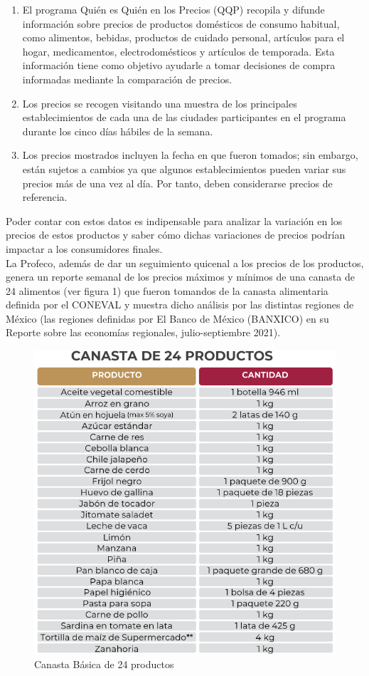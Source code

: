 \documentclass{article}
\begin{document}
\begin{enumerate}
\item El programa Quién es Quién en los Precios (QQP) recopila y difunde información sobre precios de productos domésticos de consumo habitual, como alimentos, bebidas, productos de cuidado personal, artículos para el hogar, medicamentos, electrodomésticos y artículos de temporada. Esta información tiene como objetivo ayudarle a tomar decisiones de compra informadas mediante la comparación de precios.

\item Los precios se recogen visitando una muestra de los principales establecimientos de cada una de las ciudades participantes en el programa durante los cinco días hábiles de la semana.

\item  Los precios mostrados incluyen la fecha en que fueron tomados; sin embargo, están sujetos a cambios ya que algunos establecimientos pueden variar sus precios más de una vez al día. Por tanto, deben considerarse precios de referencia.

\end{enumerate}

Poder contar con estos datos es indipensable para analizar la variación en los precios de estos productos y saber cómo dichas variaciones de precios podrían impactar a los consumidores finales.\\

La Profeco, además de dar un seguimiento quicenal a los precios de los productos, genera un reporte semanal de los precios máximos y mínimos de una canasta de 24 alimentos (ver figura 1) que fueron tomandos de la canasta alimentaria definida por el CONEVAL y muestra dicho análisis por las distintas regiones de México (las regiones definidas por El Banco de México (BANXICO) en su Reporte sobre las economías regionales, julio-septiembre 2021).

\begin{figure}[h]
\centering
\includegraphics[width=0.5\linewidth]{Reports/images/Canasta.png}
\caption{\label{fig:Architecture}Canasta Básica de 24 productos}
\end{figure}
\end{document}
